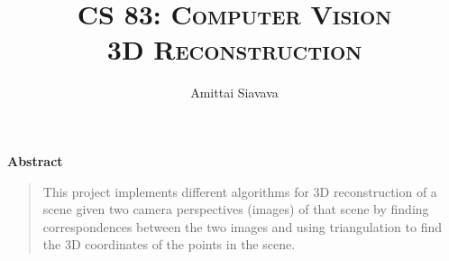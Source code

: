 \title{
  \Huge{\textsc{CS 83: Computer Vision}}\\
  \textsc{3D Reconstruction}
}

\date{\Large{}}

\begin{titlingpage}

  \author{\Large{Amittai Siavava}}
  \maketitle

  \begin{center} \textbf{Abstract} \end{center}

  
  \begin{quote}
    \small
    
    This project implements different algorithms for 3D reconstruction
    of a scene given two camera perspectives (images) of that scene
    by finding correspondences between the two images and using
    triangulation to find the 3D coordinates of the points in the scene.

  \end{quote}

  \tableofcontents
  
\end{titlingpage}
